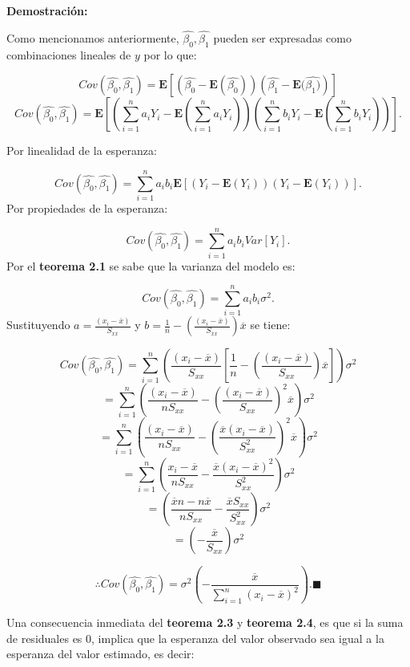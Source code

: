 \documentclass[
  a4paper,
  oneside,
  openany]{book}
\begin{document}
\textbf{Demostración:}

Como mencionamos anteriormente, \(\hat{\beta_{0}},\hat{\beta_{1}}\) pueden ser expresadas como combinaciones lineales de \(y\) por lo que:

\[Cov\left(\hat{\beta_{0}},\hat{\beta_{1}} \right)= \mathbf{E}\left[ \left( \hat{\beta_{0}}-\mathbf{E}(\hat{\beta_{0}})\right)\left(\hat{\beta_{1}}-\mathbf{E}(\hat{\beta_{1})} \right) \right]\]
\[Cov\left(\hat{\beta_{0}},\hat{\beta_{1}} \right)= \mathbf{E}\left[\left(\sum_{i=1}^{n}a_{i}Y_{i}-\mathbf{E}(\sum_{i=1}^{n}a_{i}Y_{i}) \right)\left(\sum_{i=1}^{n}b_{i}Y_{i}-\mathbf{E}(\sum_{i=1}^{n}b_{i}Y_{i}) \right)\right].\]

Por linealidad de la esperanza:

\[Cov\left(\hat{\beta_{0}},\hat{\beta_{1}}\right)=\sum_{i=1}^{n}a_{i}b_{i}\mathbf{E}[(Y_{i}-\mathbf{E}(Y_{i}))(Y_{i}-\mathbf{E}(Y_{i}))].\]
Por propiedades de la esperanza:

\[Cov\left(\hat{\beta_{0}},\hat{\beta_{1}}\right)=\sum_{i=1}^{n}a_{i}b_{i}Var[Y_{i}].\]
Por el \textbf{teorema 2.1} se sabe que la varianza del modelo es:

\[Cov\left(\hat{\beta_{0}},\hat{\beta_{1}}\right)=\sum_{i=1}^{n}a_{i}b_{i}\sigma^2.\]
Sustituyendo \(a=\frac{(x_{i}-\overline{x})}{S_{xx}}\) y \(b=\frac{1}{n}-\left(\frac{(x_{i}-\overline{x})}{S_{xx}}\right)\overline{x}\) se tiene:

\[Cov\left(\hat{\beta_{0}},\hat{\beta_{1}}\right)=\sum_{i=1}^{n}\left(\frac{(x_{i}-\overline{x})}{S_{xx}}\left[\frac{1}{n}-\left(\frac{(x_{i}-\overline{x})}{S_{xx}}\right)\overline{x}\right]\right)\sigma^2\]
\[=\sum_{i=1}^{n}\left(\frac{(x_{i}-\overline{x})}{nS_{xx}}-\left(\frac{(x_{i}-\overline{x})}{S_{xx}}\right)^2\overline{x}\right)\sigma^2\]
\[=\sum_{i=1}^{n}\left(\frac{(x_{i}-\overline{x})}{nS_{xx}}-\left(\frac{\overline{x}(x_{i}-\overline{x})}{S^2_{xx}}\right)^2\overline{x}\right)\sigma^2\]
\[=\sum_{i=1}^{n}\left(\frac{x_{i}-\overline{x}}{nS_{xx}}-\frac{\overline{x}(x_{i}-\overline{x})^2}{S^2_{xx}}\right)\sigma^2\]
\[=\left(\frac{\overline{x}n -n\overline{x}}{nS_{xx}}-\frac{\overline{x}S_{xx}}{S^2_{xx}}\right)\sigma^2\]
\[=\left(-\frac{\overline{x}}{S_{xx}}\right)\sigma^2\]

\[\therefore Cov\left(\hat{\beta_{0}},\hat{\beta_{1}}\right)=\sigma^2\left(-\frac{\overline{x}}{\sum_{i=1}^{n}(x_{i}-\overline{x})^2}\right).\blacksquare\]

Una consecuencia inmediata del \textbf{teorema 2.3} y \textbf{teorema 2.4}, es que si la suma de residuales es 0, implica que la esperanza del valor observado sea igual a la esperanza del valor estimado, es decir:
\end{document}
